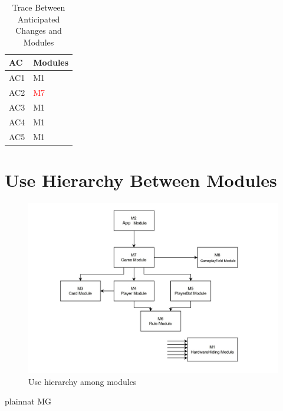 \documentclass[12pt, titlepage]{article}
\begin{document}
\begin{table}[H]
\centering
\begin{tabular}{p{} p{}}
\toprule
\textbf{AC} & \textbf{Modules}\\
\midrule
AC1 & M1\\
AC2 & \textcolor{red}{M7}\\
AC3 & M1\\
AC4 & M1 \\
AC5 & M1\\
\bottomrule
\end{tabular}
\caption{Trace Between Anticipated Changes and Modules}
\label{TblACT}
\end{table}

\section{Use Hierarchy Between Modules} \label{SecUse}

\begin{figure}[H]
\centering
\includegraphics[width=1\textwidth]{UHD.jpg}
\caption{Use hierarchy among modules}
\label{FigUH}
\end{figure}
\newpage

 {plainnat}
 {MG}
\end{document}
